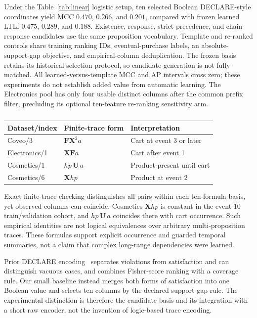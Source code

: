 Under the Table~\ref{tab:linear} logistic setup, ten selected Boolean DECLARE-style coordinates yield MCC $0.470$, $0.266$, and $0.201$, compared with frozen learned LTLf $0.475$, $0.289$, and $0.188$. Existence, response, strict precedence, and chain-response candidates use the same proposition vocabulary. Template and re-ranked controls share training ranking IDs, eventual-purchase labels, an absolute-support-gap objective, and empirical-column deduplication. The frozen basis retains its historical selection protocol, so candidate generation is not fully matched. All learned-versus-template MCC and AP intervals cross zero; these experiments do not establish added value from automatic learning. The Electronics pool has only four usable distinct columns after the common prefix filter, precluding its optional ten-feature re-ranking sensitivity arm.

\begin{table}[t]
\centering\footnotesize
\caption{}
\label{tab:actual-formulas}
\begin{tabular}{lll}\toprule Dataset/index & Finite-trace form & Interpretation \\
\midrule
Coveo/3 & $\mathbf{F}\mathbf{X}^{2}a$ & Cart at event 3 or later \\
Electronics/1 & $\mathbf{X}\mathbf{F}a$ & Cart after event 1 \\
Cosmetics/1 & $hp\,\mathbf{U}\,a$ & Product-present until cart \\
Cosmetics/6 & $\mathbf{X}hp$ & Product at event 2 \\
\bottomrule\end{tabular}
\end{table}
Exact finite-trace checking distinguishes all pairs within each ten-formula basis, yet observed columns can coincide. Cosmetics $\mathbf{X}hp$ is constant in the event-10 train/validation cohort, and $hp\,\mathbf{U}\,a$ coincides there with cart occurrence. Such empirical identities are not logical equivalences over arbitrary multi-proposition traces. These formulas support explicit occurrence and guarded temporal summaries, not a claim that complex long-range dependencies were learned.

Prior DECLARE encoding~\cite{di2022making} separates violations from satisfaction and can distinguish vacuous cases, and combines Fisher-score ranking with a coverage rule. Our small baseline instead merges both forms of satisfaction into one Boolean value and selects ten columns by the declared support-gap rule. The experimental distinction is therefore the candidate basis and its integration with a short raw encoder, not the invention of logic-based trace encoding.

